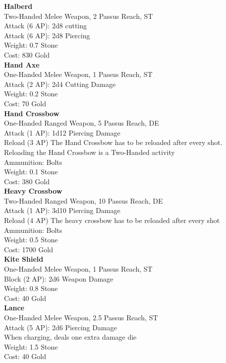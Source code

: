 \textbf{Halberd}\\
Two-Handed Melee Weapon, 2 Passus Reach, ST\\
Attack (6 AP): 2d8 cutting\\
Attack (6 AP): 2d8 Piercing\\
Weight: 0.7 Stone\\
Cost: 830 Gold\\


\textbf{Hand Axe}\\
One-Handed Melee Weapon, 1 Passus Reach, ST\\
Attack (2 AP): 2d4 Cutting Damage\\
Weight: 0.2 Stone\\
Cost: 70 Gold\\


\textbf{Hand Crossbow}\\
One-Handed Ranged Weapon, 5 Passus Reach, DE\\
Attack (1 AP): 1d12 Piercing Damage\\
Reload (3 AP) The Hand Crossbow has to be reloaded after every shot.\\
Reloading the Hand Crossbow is a Two-Handed activity\\
Ammunition: Bolts\\
Weight: 0.1 Stone\\
Cost: 380 Gold\\


\textbf{Heavy Crossbow}\\
Two-Handed Ranged Weapon, 10 Passus Reach, DE\\
Attack (1 AP): 3d10 Piercing Damage\\
Reload (4 AP) The heavy crossbow has to be reloaded after every shot\\
Ammunition: Bolts\\
Weight: 0.5 Stone\\
Cost: 1700 Gold\\


\textbf{Kite Shield}\\
One-Handed Melee Weapon, 1 Passus Reach, ST\\
Block (2 AP): 2d6 Weapon Damage\\
Weight: 0.8 Stone\\
Cost: 40 Gold\\


\textbf{Lance}\\
One-Handed Melee Weapon, 2.5 Passus Reach, ST\\
Attack (5 AP): 2d6 Piercing Damage\\
When charging, deals one extra damage die\\
Weight: 1.5 Stone\\
Cost: 40 Gold\\


